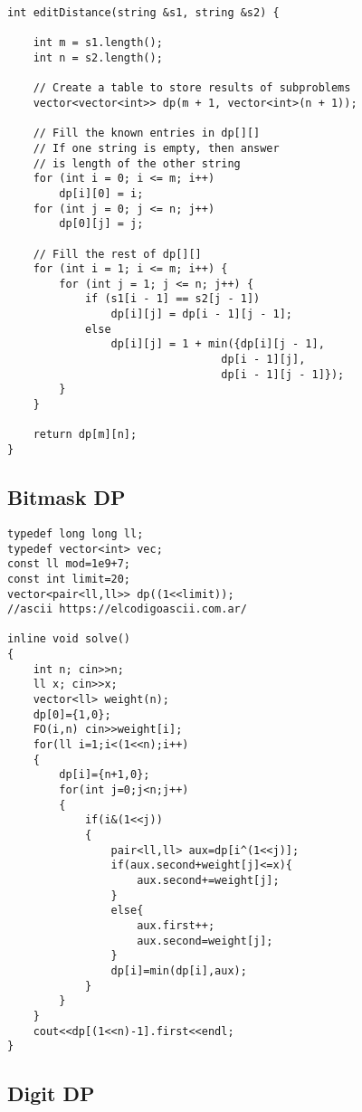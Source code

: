\documentclass[10pt]{article}
\begin{document}
\begin{multicols*}{2}
\begin{lstlisting}[style=compactcpp]
int editDistance(string &s1, string &s2) {
  
    int m = s1.length();
    int n = s2.length();

    // Create a table to store results of subproblems
    vector<vector<int>> dp(m + 1, vector<int>(n + 1));

    // Fill the known entries in dp[][]
    // If one string is empty, then answer 
    // is length of the other string
    for (int i = 0; i <= m; i++) 
        dp[i][0] = i;
    for (int j = 0; j <= n; j++) 
        dp[0][j] = j; 

    // Fill the rest of dp[][]
    for (int i = 1; i <= m; i++) {
        for (int j = 1; j <= n; j++) {
            if (s1[i - 1] == s2[j - 1])
                dp[i][j] = dp[i - 1][j - 1];
            else
                dp[i][j] = 1 + min({dp[i][j - 1],  
                                 dp[i - 1][j],   
                                 dp[i - 1][j - 1]});
        }
    }

    return dp[m][n];
} 
\end{lstlisting}

\subsection{Bitmask DP}
\begin{lstlisting}[style=compactcpp]
typedef long long ll;
typedef vector<int> vec;
const ll mod=1e9+7;
const int limit=20;
vector<pair<ll,ll>> dp((1<<limit));
//ascii https://elcodigoascii.com.ar/

inline void solve()
{
    int n; cin>>n;
    ll x; cin>>x;
    vector<ll> weight(n);
    dp[0]={1,0};
    FO(i,n) cin>>weight[i];
    for(ll i=1;i<(1<<n);i++)
    {
        dp[i]={n+1,0};
        for(int j=0;j<n;j++)
        {
            if(i&(1<<j))
            {
                pair<ll,ll> aux=dp[i^(1<<j)];
                if(aux.second+weight[j]<=x){
                    aux.second+=weight[j];
                }
                else{
                    aux.first++;
                    aux.second=weight[j];
                }
                dp[i]=min(dp[i],aux);
            }
        }
    }
    cout<<dp[(1<<n)-1].first<<endl;
}
\end{lstlisting}

\subsection{Digit DP}


\end{multicols*}
\end{document}
